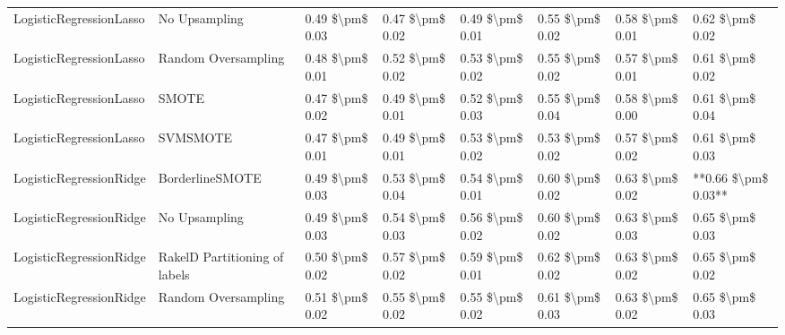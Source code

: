 \begin{tabular}{llllllll}
        LogisticRegressionLasso &                 No Upsampling & 0.49 \$\textbackslash pm\$ 0.03 &           0.47 \$\textbackslash pm\$ 0.02 &       0.49 \$\textbackslash pm\$ 0.01 &        0.55 \$\textbackslash pm\$ 0.02 &                         0.58 \$\textbackslash pm\$ 0.01 &     0.62 \$\textbackslash pm\$ 0.02 \\
        LogisticRegressionLasso &           Random Oversampling & 0.48 \$\textbackslash pm\$ 0.01 &           0.52 \$\textbackslash pm\$ 0.02 &       0.53 \$\textbackslash pm\$ 0.02 &        0.55 \$\textbackslash pm\$ 0.02 &                         0.57 \$\textbackslash pm\$ 0.01 &     0.61 \$\textbackslash pm\$ 0.02 \\
        LogisticRegressionLasso &                         SMOTE & 0.47 \$\textbackslash pm\$ 0.02 &           0.49 \$\textbackslash pm\$ 0.01 &       0.52 \$\textbackslash pm\$ 0.03 &        0.55 \$\textbackslash pm\$ 0.04 &                         0.58 \$\textbackslash pm\$ 0.00 &     0.61 \$\textbackslash pm\$ 0.04 \\
        LogisticRegressionLasso &                      SVMSMOTE & 0.47 \$\textbackslash pm\$ 0.01 &           0.49 \$\textbackslash pm\$ 0.01 &       0.53 \$\textbackslash pm\$ 0.02 &        0.53 \$\textbackslash pm\$ 0.02 &                         0.57 \$\textbackslash pm\$ 0.02 &     0.61 \$\textbackslash pm\$ 0.03 \\
        LogisticRegressionRidge &               BorderlineSMOTE & 0.49 \$\textbackslash pm\$ 0.03 &           0.53 \$\textbackslash pm\$ 0.04 &       0.54 \$\textbackslash pm\$ 0.01 &        0.60 \$\textbackslash pm\$ 0.02 &                         0.63 \$\textbackslash pm\$ 0.02 & **0.66 \$\textbackslash pm\$ 0.03** \\
        LogisticRegressionRidge &                 No Upsampling & 0.49 \$\textbackslash pm\$ 0.03 &           0.54 \$\textbackslash pm\$ 0.03 &       0.56 \$\textbackslash pm\$ 0.02 &        0.60 \$\textbackslash pm\$ 0.02 &                         0.63 \$\textbackslash pm\$ 0.03 &     0.65 \$\textbackslash pm\$ 0.03 \\
        LogisticRegressionRidge & RakelD Partitioning of labels & 0.50 \$\textbackslash pm\$ 0.02 &           0.57 \$\textbackslash pm\$ 0.02 &       0.59 \$\textbackslash pm\$ 0.01 &        0.62 \$\textbackslash pm\$ 0.02 &                         0.63 \$\textbackslash pm\$ 0.02 &     0.65 \$\textbackslash pm\$ 0.02 \\
        LogisticRegressionRidge &           Random Oversampling & 0.51 \$\textbackslash pm\$ 0.02 &           0.55 \$\textbackslash pm\$ 0.02 &       0.55 \$\textbackslash pm\$ 0.02 &        0.61 \$\textbackslash pm\$ 0.03 &                         0.63 \$\textbackslash pm\$ 0.02 &     0.65 \$\textbackslash pm\$ 0.03 \\

\end{tabular}
